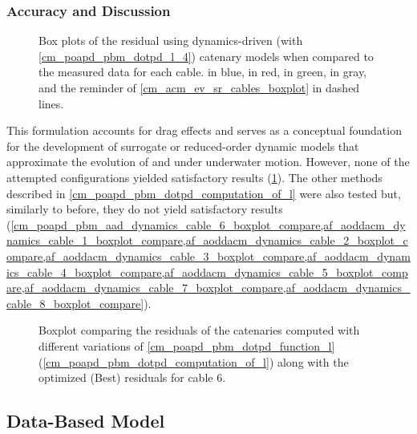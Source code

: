 \trigft{}

\subsubsection{Accuracy and Discussion}
\label{cm_poapd_pbm_aad_accuracy_and_discussion}

\begin{figure}
	\centering
	\caption{
		Box plots of the residual using dynamics-driven (with \cref{cm_poapd_pbm_dotpd_l_4}) catenary
		models when compared to the measured data for each cable. \verticalmodel{} in blue, \gammamodel{}
		in red, \thetamodel{} in green, \thetagammamodel{} in gray, and the reminder of
		\cref{cm_acm_ev_sr_cables_boxplot} in dashed lines.
	}
	\label{cm_poapd_pbm_aad_dynamics_cables_boxplot}
\end{figure}

This formulation accounts for drag effects and serves as a conceptual foundation for the
development of surrogate or reduced-order dynamic models that approximate the evolution of
\scal{\theta} and \scal{\gamma} under underwater motion. However, none of the attempted
configurations yielded satisfactory results (\cref{cm_poapd_pbm_aad_dynamics_cables_boxplot}). The
other methods described in \cref{cm_poapd_pbm_dotpd_computation_of_l} were also tested but,
similarly to before, they do not yield satisfactory results
(\cref{cm_poapd_pbm_aad_dynamics_cable_6_boxplot_compare,af_aoddacm_dynamics_cable_1_boxplot_compare,af_aoddacm_dynamics_cable_2_boxplot_compare,af_aoddacm_dynamics_cable_3_boxplot_compare,af_aoddacm_dynamics_cable_4_boxplot_compare,af_aoddacm_dynamics_cable_5_boxplot_compare,af_aoddacm_dynamics_cable_7_boxplot_compare,af_aoddacm_dynamics_cable_8_boxplot_compare}).

\begin{figure}
	\centering
	\caption{
		Boxplot comparing the residuals of the catenaries computed with different variations of
		\cref{cm_poapd_pbm_dotpd_function_l} (\cref{cm_poapd_pbm_dotpd_computation_of_l}) along with the
		optimized (Best) residuals for cable 6.
	}
	\label{cm_poapd_pbm_aad_dynamics_cable_6_boxplot_compare}
\end{figure}

\subsection{Data-Based Model}
\label{cm_poapd_data_based_model}

